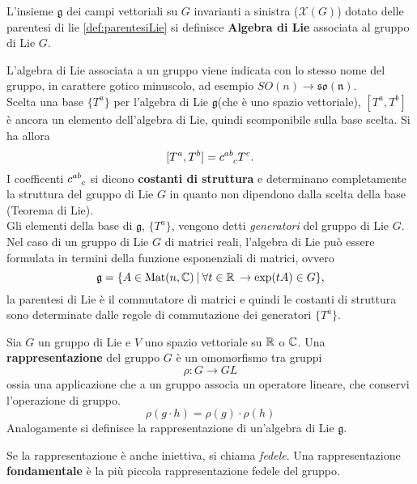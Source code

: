 \begin{definition}\label{}
   L'insieme $\mathfrak{g}$ dei campi vettoriali su $G$ invarianti a sinistra
   ($\mathcal{X}(G)$)
   dotato delle parentesi di lie \ref{def:parentesiLie} si definisce
   \textbf{Algebra di Lie} associata al gruppo di Lie $G$.
\end{definition}
L'algebra di Lie associata a un gruppo viene indicata con lo stesso nome del gruppo,
in carattere gotico minuscolo, ad esempio $SO(n)\to \mathfrak{so(n)}$.\\

Scelta una base  $\{T^a\}$ per l'algebra di Lie $\mathfrak{g}$(che è uno spazio
vettoriale), $[T^a,T^b]$ è ancora un elemento dell'algebra di Lie,
quindi scomponibile sulla base scelta. Si ha allora
$$
    [T^a,T^b] = c^{ab}_{\hphantom{ab}c} T^c .
$$
I coefficenti $ c^{ab}_{\hphantom{ab}c}$ si dicono \textbf{costanti di struttura}
e determinano completamente la struttura del gruppo di Lie $G$ in quanto non
dipendono dalla scelta della base (Teorema di Lie).\\
Gli elementi della base di $\mathfrak{g}$, $\{T^a\}$, vengono detti
\emph{generatori} del gruppo di Lie $G$.\\
Nel caso di un gruppo di Lie $G$ di matrici reali, l'algebra di Lie può essere
formulata in termini della funzione esponenziali di matrici, ovvero
$$
\mathfrak{g} = \{ A \in \mathrm{Mat}(n,\mathbb{C}) \: | \:
\forall t \in \mathbb{R} \:\to \exp (tA) \in G \},
$$
la parentesi di Lie è il commutatore di matrici e quindi le costanti di struttura
sono determinate dalle regole di commutazione dei generatori $\{T^a\}$.\\

\begin{definition}
   Sia $G$ un gruppo di Lie e $V$ uno spazio vettoriale su $\mathbb{R}$ o $\mathbb{C}$. Una
   \textbf{rappresentazione} del gruppo $G$ è un omomorfismo tra gruppi
   $$ \rho : G \to GL $$
   ossia una applicazione che a un gruppo associa un operatore lineare, che conservi
   l'operazione di gruppo.
   $$ \rho(g \cdot h) = \rho(g) \cdot \rho(h) $$
   Analogamente si definisce la rappresentazione di un'algebra di Lie $\mathfrak{g}$.
\end{definition}
Se la rappresentazione è anche iniettiva, si chiama \emph{fedele}. Una rappresentazione
\textbf{fondamentale} è la più piccola rappresentazione fedele del gruppo.

